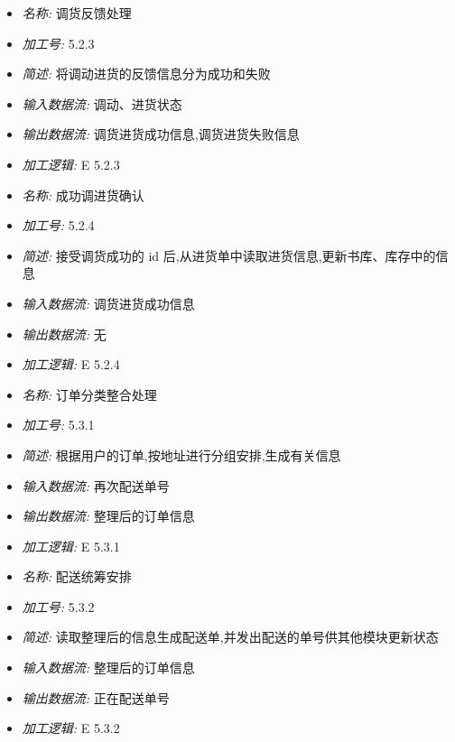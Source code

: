 \documentclass{article}
\begin{document}
\begin{CJK*}{UTF8}{gbsn}
\begin{itemize}
\end{itemize}


\vspace{-1mm}


\begin{itemize}
\item \textit{名称: }调货反馈处理
\item \textit{加工号: }5.2.3
\item \textit{简述: } 将调动进货的反馈信息分为成功和失败 
\item \textit{输入数据流: } 调动、进货状态
\item \textit{输出数据流: } 调货进货成功信息,调货进货失败信息 
\item \textit{加工逻辑: } E 5.2.3

\end{itemize}


\vspace{-1mm}


\begin{itemize}
\item \textit{名称: }成功调进货确认
\item \textit{加工号: }5.2.4
\item \textit{简述: } 接受调货成功的 id 后,从进货单中读取进货信息,更新书库、库存中的信息 
\item \textit{输入数据流: } 调货进货成功信息
\item \textit{输出数据流: } 无
\item \textit{加工逻辑: } E 5.2.4

\end{itemize}


\vspace{-1mm}


\begin{itemize}
\item \textit{名称: }订单分类整合处理
\item \textit{加工号: }5.3.1
\item \textit{简述: } 根据用户的订单,按地址进行分组安排,生成有关信息 
\item \textit{输入数据流: } 再次配送单号
\item \textit{输出数据流: } 整理后的订单信息
\item \textit{加工逻辑: } E 5.3.1

\end{itemize}


\vspace{-1mm}


\begin{itemize}
\item \textit{名称: }配送统筹安排
\item \textit{加工号: }5.3.2
\item \textit{简述: } 读取整理后的信息生成配送单,并发出配送的单号供其他模块更新状态 
\item \textit{输入数据流: } 整理后的订单信息
\item \textit{输出数据流: } 正在配送单号
\item \textit{加工逻辑: } E 5.3.2


\end{itemize}
\end{CJK*}
\end{document}
